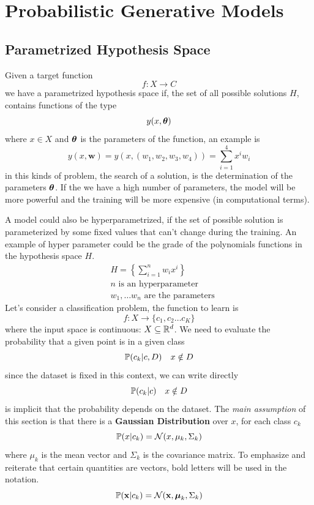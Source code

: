 \documentclass[10pt, letterpaper]{report}
\begin{document}
\section{Probabilistic Generative Models}
\subsection{Parametrized Hypothesis Space}
Given a target function
$$ f:X\rightarrow C $$
we have a parametrized hypothesis space if, the set of all possible solutions $H$, contains functions of the type
\begin{equation}
    y(x,{\boldsymbol{\theta}})
\end{equation}
where $x\in X$ and ${\boldsymbol{\theta}}$ is the parameters of the function, an example is\begin{equation}
    y(x,\mathbf w)=y(x,(w_1,w_2,w_3,w_4))=\sum_{i=1}^4x^iw_i
\end{equation}
in this kinds of problem, the search of a solution, is the determination of the parameters ${\boldsymbol{\theta}}$. If the we have a high number of parameters, the model will be more powerful and the training will be more expensive (in computational terms).

A model could also be hyperparametrized, if the set of possible solution is parameterized by some fixed values that can't change during the training. An example of hyper parameter could be the grade of the polynomials functions in the hypothesis space $H$.
\begin{align*}
    &H=\left\{\sum_{i=1}^nw_ix^i\right\}\\
    &n\text{ is an hyperparameter}\\
    &w_1,\dots w_n\text{ are the parameters}
\end{align*}
Let's consider a classification problem, the function to learn is\begin{equation}
    f:X\rightarrow\{c_1,c_2\dots c_K\}
\end{equation}
where the input space is continuous: $X\subseteq{\mathbb R}^d$. We need to evaluate the probability that a given point is in a given class\begin{equation}
    {\mathbb P}(c_k|c,D) \ \ \ x\notin D 
\end{equation}
since the dataset is fixed in this context, we can write directly \begin{equation}
    {\mathbb P}(c_k|c) \ \ \ x\notin D 
\end{equation}
is implicit that the probability depends on the dataset. The \textit{main assumption} of this section is that there is a \textbf{Gaussian Distribution} over $x$, for each class $c_k$\begin{equation}
    {\mathbb P}(x|c_k)=\mathcal N(x,\mu_k,\Sigma_k)
\end{equation}
where $\mu_k$ is the mean vector and $\Sigma_k$ is the covariance matrix. To emphasize and reiterate that certain quantities are vectors, bold letters will be used in the notation.
\begin{equation}
    {\mathbb P}(\mathbf x|c_k)=\mathcal N(\mathbf  x,{\boldsymbol{\mu}}_k,\Sigma_k)
\end{equation}
\end{document}

